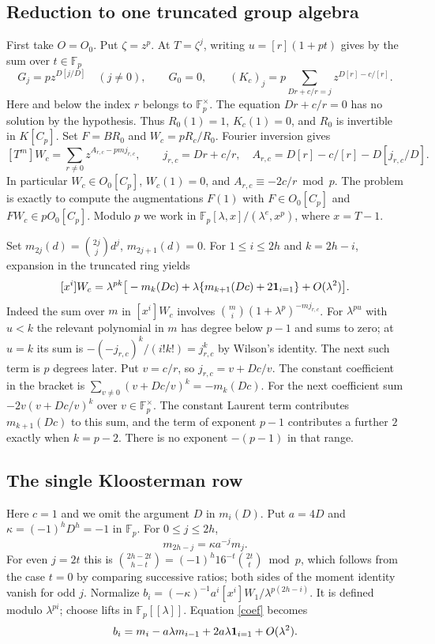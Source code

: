 \documentclass[11pt]{article}
\begin{document}
\subsection{Reduction to one truncated group algebra}
First take $O=O_0$. Put $\zeta=z^p$. At $T=\zeta^j$, writing
$u=[r](1+pt)$ gives by the sum over $t\in\mathbb F_p$
\[
 G_j=pz^{D[j/D]}\quad(j\ne0),\qquad G_0=0,\qquad
 (K_c)_j=p\sum_{Dr+c/r=j}z^{D[r]-c/[r]} .
\]
Here and below the index $r$ belongs to $\mathbb F_p^\times$. The equation
$Dr+c/r=0$ has no solution by the hypothesis. Thus $R_0(1)=1$,
$K_c(1)=0$, and $R_0$ is invertible in $K[C_p]$.
Set $F=B R_0$ and $W_c=pR_c/R_0$. Fourier inversion gives
\[
 [T^m]W_c=\sum_{r\ne0}z^{A_{r,c}-pmj_{r,c}},\qquad
 j_{r,c}=Dr+c/r,\quad A_{r,c}=D[r]-c/[r]-D[j_{r,c}/D].
\]
In particular $W_c\in O_0[C_p]$, $W_c(1)=0$, and
$A_{r,c}\equiv-2c/r\bmod p$. The problem is exactly to compute the
augmentations $F(1)$ with $F\in O_0[C_p]$ and $FW_c\in pO_0[C_p]$.
Modulo $p$ we work in
$\mathbb F_p[\lambda,x]/(\lambda^e,x^p)$, where $x=T-1$.

Set $m_{2j}(d)=\binom{2j}{j}d^j$, $m_{2j+1}(d)=0$. For
$1\le i\le 2h$ and $k=2h-i$, expansion in the truncated ring yields
\begin{equation}\label{coef}
 [x^i]W_c=\lambda^{pk}
 \big[-m_k(Dc)+\lambda\{m_{k+1}(Dc)+2{\bf1}_{i=1}\}
           +O(\lambda^2)\big].
\end{equation}
Indeed the sum over $m$ in $[x^i]W_c$ involves
$\binom mi(1+\lambda^p)^{-mj_{r,c}}$. For $\lambda^{pu}$ with
$u<k$ the relevant polynomial in $m$ has degree below $p-1$
and sums to zero; at $u=k$ its sum is
$-(-j_{r,c})^k/(i!k!)=j_{r,c}^k$ by Wilson's identity.
The next such term is $p$ degrees later. Put $v=c/r$, so
$j_{r,c}=v+Dc/v$. The constant coefficient in the bracket is
$\sum_{v\ne0}(v+Dc/v)^k=-m_k(Dc)$. For the next coefficient sum
$-2v(v+Dc/v)^k$ over $v\in\mathbb F_p^\times$. The constant Laurent term
contributes $m_{k+1}(Dc)$ to this sum, and the term of exponent
$p-1$ contributes a further $2$ exactly when $k=p-2$.
There is no exponent $-(p-1)$ in that range.

\subsection{The single Kloosterman row}
Here $c=1$ and we omit the argument $D$ in $m_i(D)$. Put $a=4D$
and $\kappa=(-1)^hD^h=-1$ in $\mathbb F_p$. For $0\le j\le 2h$,
\[
 m_{2h-j}=\kappa a^{-j}m_j .
\]
For even $j=2t$ this is
$\binom{2h-2t}{h-t}=(-1)^h16^{-t}\binom{2t}t\bmod p$,
which follows from the case $t=0$ by comparing successive ratios;
both sides of the moment identity vanish for odd $j$.
Normalize $b_i=(-\kappa)^{-1}a^i[x^i]W_1/\lambda^{p(2h-i)}$.
It is defined modulo $\lambda^{pi}$; choose lifts in $\mathbb F_p[[\lambda]]$.
Equation \eqref{coef} becomes
\begin{equation}\label{bi}
 b_i=m_i-a\lambda m_{i-1}+2a\lambda{\bf1}_{i=1}+O(\lambda^2).
\end{equation}
\end{document}
